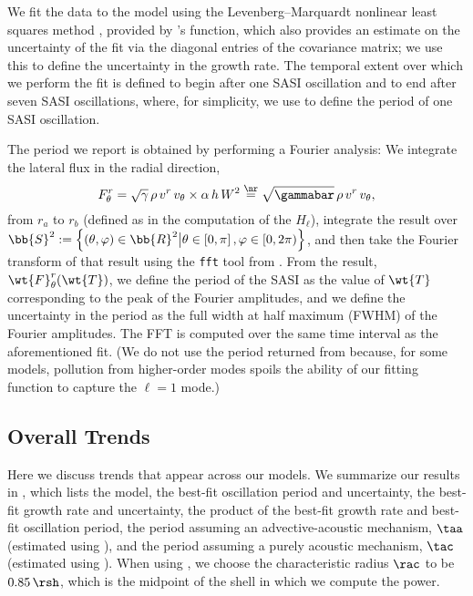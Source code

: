 We fit the data to the model using the Levenberg--Marquardt nonlinear
least squares method \citep[e.g., see][]{m1978},
provided by \scipy 's \curvefit{} function,
which also provides an estimate on the uncertainty of the fit via the diagonal
entries of the covariance matrix; we use this to define the uncertainty
in the growth rate.
The temporal extent over which we perform the fit is defined to begin
after one SASI oscillation and to end after seven SASI oscillations,
where, for simplicity, we use  to define the period of one
SASI oscillation.

The period we report is obtained by performing a Fourier analysis:
We integrate the lateral flux in the radial direction,
\begin{equation}
  F^{r}_{\theta}=\sqrt{\gamma}\,\rho\,v^{r}\,v_{\theta}\times\alpha\,h\,W^{2}
  \stackrel{\nr}{=}\sqrt{\gammabar}\,\rho\,v^{r}\,v_{\theta},
  \label{eq.F12}
\end{equation}
from $r_{a}$ to $r_{b}$ (defined as in the computation of the $H_{\ell}$),
integrate the result over
$\bb{S}^{2}:=\left\{\left(\theta,\varphi\right)\in\bb{R}^{2}
\big|\theta\in\left[0,\pi\right],\varphi\in\left[0,2\pi\right)\right\}$,
and then take the Fourier transform of that result
using the \texttt{fft} tool from \scipy.
From the result, $\wt{F}^{r}_{\theta}(\wt{T})$,
we define the period of the SASI as the value of $\wt{T}$ corresponding to the
peak of the Fourier amplitudes, and
we define the uncertainty in the period as the
full width at half maximum (FWHM) of the Fourier amplitudes.
The FFT is computed over the same time interval as the aforementioned fit.
(We do not use the period returned from \curvefit{} because,
for some models, pollution from
higher-order modes spoils the ability of our fitting function to capture
the $\ell=1$ mode.)

\subsection{Overall Trends}
\label{sec.models}

Here we discuss trends that appear across our models.
We summarize our results in ,
which lists the model, the best-fit oscillation period and uncertainty,
the best-fit growth rate and uncertainty,
the product of the best-fit growth rate and best-fit oscillation period,
the period assuming an advective-acoustic mechanism, $\taa$
(estimated using ),
and the period assuming a purely acoustic mechanism, $\tac$
(estimated using ).
When using , we choose the characteristic radius $\rac$
to be $0.85\,\rsh$, which is the midpoint of the shell in which we compute
the power.


